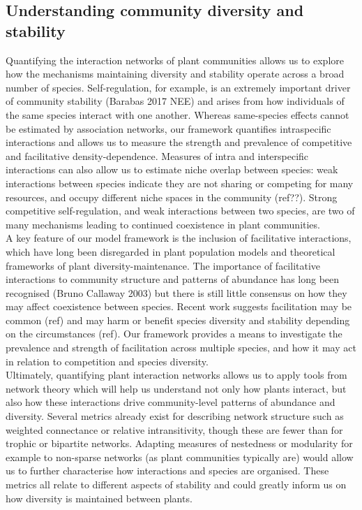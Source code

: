\documentclass[a4,12pt]{article}
\begin{document}
      
    \subsection{Understanding community diversity and stability}

        Quantifying the interaction networks of plant communities allows us to explore how the mechanisms maintaining diversity and stability operate across a broad number of species. Self-regulation, for example, is an extremely important driver of community stability (Barabas 2017 NEE) and arises from how individuals of the same species interact with one another. Whereas same-species effects cannot be estimated by association networks, our framework quantifies intraspecific interactions and allows us to measure the strength and prevalence of competitive and facilitative density-dependence. Measures of intra and interspecific interactions can also allow us to estimate niche overlap between species: weak interactions between species indicate they are not sharing or competing for many resources, and occupy different niche spaces in the community (ref??). Strong competitive self-regulation, and weak interactions between two species, are two of many mechanisms leading to continued coexistence in plant communities.\\

        A key feature of our model framework is the inclusion of facilitative interactions, which have long been disregarded in plant population models and theoretical frameworks of plant diversity-maintenance. The importance of facilitative interactions to community structure and patterns of abundance has long been recognised (Bruno Callaway 2003) but there is still little consensus on how they may affect coexistence between species. %
        Recent work suggests facilitation may be common (ref) and may harm or benefit species diversity and stability depending on the circumstances (ref). Our framework provides a means to investigate the prevalence and strength of facilitation across multiple species, and how it may act in relation to competition and species diversity.  \\
     
        Ultimately, quantifying plant interaction networks allows us to apply tools from network theory which will help us understand not only how plants interact, but also how these interactions drive community-level patterns of abundance and diversity. Several metrics already exist for describing network structure such as weighted connectance or relative intransitivity, though these are fewer than for trophic or bipartite networks. Adapting measures of nestedness or modularity for example to non-sparse networks (as plant communities typically are) would allow us to further characterise how interactions and species are organised. These metrics all relate to different aspects of stability and could greatly inform us on how diversity is maintained between plants.  
\end{document}

